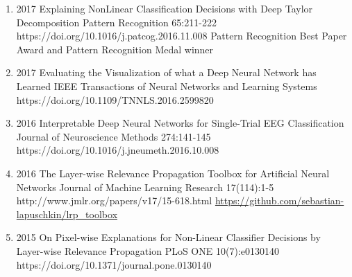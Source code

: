 \documentclass[10pt,a4paper]{article} %
\begin{document}
{\begin{enumerate}
    \item {}
                            {2017}
                            {Explaining NonLinear Classification Decisions with Deep Taylor Decomposition}
                            {Pattern Recognition}
                            {65:211-222}
                            {https://doi.org/10.1016/j.patcog.2016.11.008}
                            {Pattern Recognition Best Paper Award and Pattern Recognition Medal winner}

    \item {}
                        {2017}
                        {Evaluating the Visualization of what a Deep Neural Network has Learned}
                        {IEEE Transactions of Neural Networks and Learning Systems}
                        {}
                        {https://doi.org/10.1109/TNNLS.2016.2599820}

    \item {}
                        {2016}
                        {Interpretable Deep Neural Networks for Single-Trial EEG Classification}
                        {Journal of Neuroscience Methods}
                        {274:141-145}
                        {https://doi.org/10.1016/j.jneumeth.2016.10.008}

    \item {}
                        {2016}
                        {The Layer-wise Relevance Propagation Toolbox for Artificial Neural Networks}
                        {Journal of Machine Learning Research}
                        {17(114):1-5}
                        {http://www.jmlr.org/papers/v17/15-618.html}
                        {\href{https://github.com/sebastian-lapuschkin/lrp_toolbox}{https://github.com/sebastian-lapuschkin/lrp\_toolbox}}

    \item {}
                        {2015}
                        {On Pixel-wise Explanations for Non-Linear Classifier Decisions by Layer-wise Relevance Propagation}
                        {PLoS ONE}
                        {10(7):e0130140}
                        {https://doi.org/10.1371/journal.pone.0130140}
\end{enumerate}
}
\end{document}
